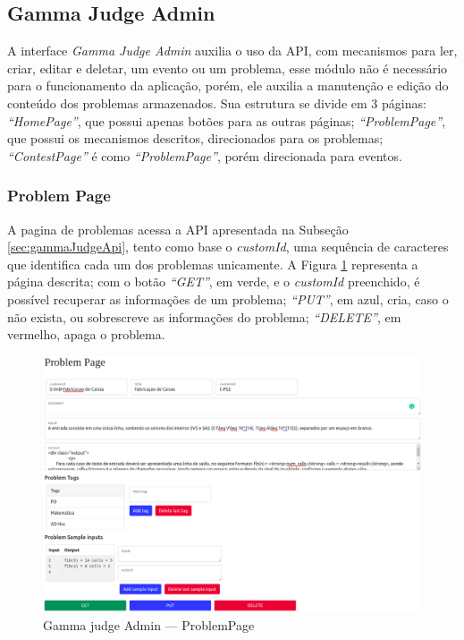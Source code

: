 \subsection{Gamma Judge Admin}
\label{sec:gamaJudgeAdmin}

A interface \textit{Gamma Judge Admin} auxilia o uso da API, com mecanismos para ler, criar, editar e deletar, um evento ou um problema, esse módulo não é necessário para o funcionamento da aplicação, porém, ele auxilia a manutenção e edição do conteúdo dos problemas armazenados. Sua estrutura se divide em 3 páginas:\textit{ “HomePage”}, que possui apenas botões para as outras páginas; \textit{``ProblemPage''}, que possui os mecanismos descritos, direcionados para os problemas; \textit{``ContestPage''} é como \textit{``ProblemPage''}, porém direcionada para eventos.

\subsubsection{Problem Page}

A pagina de problemas acessa a API apresentada na Subseção \ref{sec:gammaJudgeApi}, tento como base o \textit{customId}, uma sequência de caracteres que identifica cada um dos problemas unicamente. A Figura \ref{fig:judge_admin_problem} representa a página descrita; com o botão \textit{``GET''}, em verde, e o \textit{customId} preenchido, é possível recuperar as informações de um problema; \textit{``PUT''}, em azul, cria, caso o  não exista, ou sobrescreve as informações do problema; \textit{``DELETE''}, em vermelho, apaga o problema.

\begin{figure}[H]
    \centering
    \includegraphics[keepaspectratio=true,scale=0.32]{figuras/problem_page.eps}
    \caption{Gamma judge Admin — ProblemPage}
    \label{fig:judge_admin_problem}
\end{figure}

